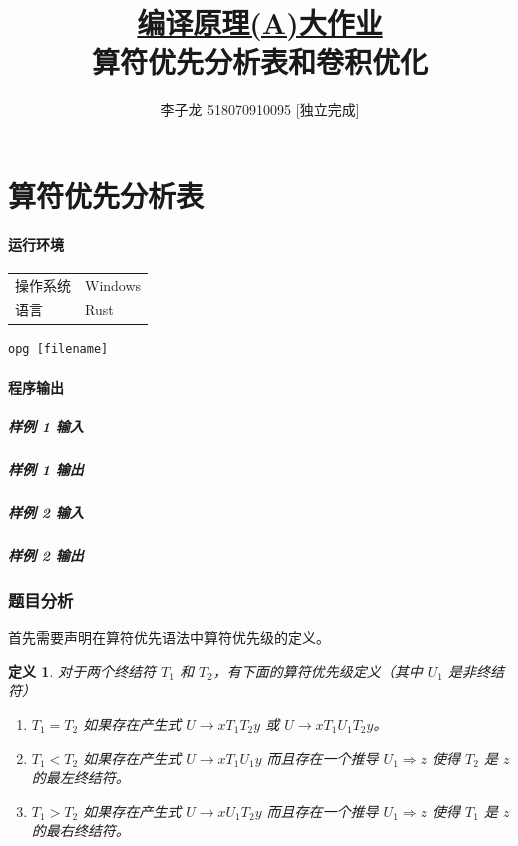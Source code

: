 \documentclass[UTF8]{ctexart}
\title{\normalsize\underline{编译原理(A)大作业}\\\Large 算符优先分析表和卷积优化}
\author{李子龙 518070910095 [独立完成]}
\newtheorem{definition}{定义}
\begin{document}
    \maketitle 
    \tableofcontents
    \clearpage

\part{算符优先分析表}
\subsection*{运行环境}
\begin{tabular}{ll}
    操作系统 & Windows \\
    语言 & Rust\cite{SteveKlabnik2019} \\
\end{tabular}
\vspace*{1em}
\begin{lstlisting}[frameround=fttt]
    opg [filename]
\end{lstlisting}
\subsection*{程序输出}
\subsubsection*{样例 1 输入}

\subsubsection*{样例 1 输出}

\subsubsection*{样例 2 输入}

\subsubsection*{样例 2 输出}


\section{题目分析}

首先需要声明在算符优先语法中算符优先级的定义\cite{Floyd1963}。
\begin{definition}\label{def:op}
    对于两个终结符 $T_1$ 和 $T_2$，有下面的算符优先级定义（其中 $U_1$ 是非终结符）
    \begin{enumerate}
        \item $T_1=T_2$ 如果存在产生式 $U\rightarrow xT_1T_2y$ 或 $U\rightarrow xT_1 U_1 T_2 y$。
        \item $T_1<T_2$ 如果存在产生式 $U\rightarrow xT_1U_1y$ 而且存在一个推导 $U_1\Rightarrow z$ 使得 $T_2$ 是 $z$ 的最左终结符。
        \item $T_1>T_2$ 如果存在产生式 $U\rightarrow xU_1T_2y$ 而且存在一个推导 $U_1\Rightarrow z$ 使得 $T_1$ 是 $z$ 的最右终结符。
    \end{enumerate}
\end{definition}
\end{document}

